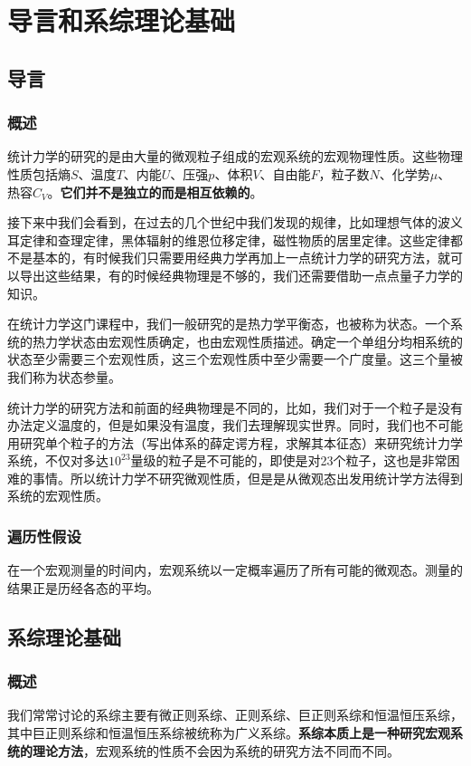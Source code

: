 \chapter{导言和系综理论基础} %
\label{cha:导言和系综理论基础}
\section{导言} %
\label{sec:导言}
\subsection{概述}
统计力学的研究的是由大量的微观粒子组成的宏观系统的宏观物理性质。这些物理性质包括熵$S$、温度$T$、内能$U$、压强$p$、体积$V$、自由能$F$，粒子数$N$、化学势$\mu$、热容$C_V$。\textbf{它们并不是独立的而是相互依赖的}。

接下来中我们会看到，在过去的几个世纪中我们发现的规律，比如理想气体的波义耳定律和查理定律，黑体辐射的维恩位移定律，磁性物质的居里定律。这些定律都不是基本的，有时候我们只需要用经典力学再加上一点统计力学的研究方法，就可以导出这些结果，有的时候经典物理是不够的，我们还需要借助一点点量子力学的知识。


在统计力学这门课程中，我们一般研究的是热力学平衡态，也被称为状态。一个系统的热力学状态由宏观性质确定，也由宏观性质描述。确定一个单组分均相系统的状态至少需要三个宏观性质，这三个宏观性质中至少需要一个广度量。这三个量被我们称为状态参量。

统计力学的研究方法和前面的经典物理是不同的，比如，我们对于一个粒子是没有办法定义温度的，但是如果没有温度，我们去理解现实世界。同时，我们也不可能用研究单个粒子的方法（写出体系的薛定谔方程，求解其本征态）来研究统计力学系统，不仅对多达$10^{23}$量级的粒子是不可能的，即使是对23个粒子，这也是非常困难的事情。所以统计力学不研究微观性质，但是是从微观态出发用统计学方法得到系统的宏观性质。

\subsection{遍历性假设}
\begin{theorem}
       在一个宏观测量的时间内，宏观系统以一定概率遍历了所有可能的微观态。测量的结果正是历经各态的平均。
\end{theorem}
\section{系综理论基础} %
\label{sec:系综理论基础}
\subsection{概述} %
\label{sub:概述}
我们常常讨论的系综主要有微正则系综、正则系综、巨正则系综和恒温恒压系综，其中巨正则系综和恒温恒压系综被统称为广义系综。\textbf{系综本质上是一种研究宏观系统的理论方法}，宏观系统的性质不会因为系统的研究方法不同而不同。

